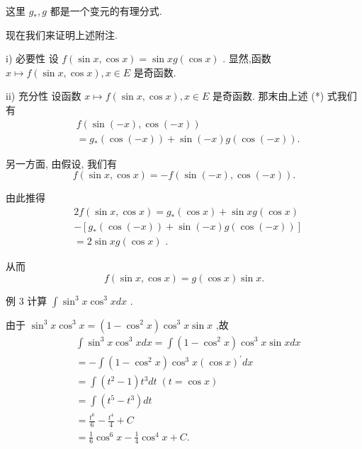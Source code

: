 这里 ${g}_{ * },g$ 都是一个变元的有理分式.

现在我们来证明上述附注.

i) 必要性 设 $f\left( {\sin x,\cos x}\right)  = \sin {xg}\left( {\cos x}\right)$ . 显然,函数 $x \mapsto  f\left( {\sin x,\cos x}\right) ,x \in  E$ 是奇函数.

ii) 充分性 设函数 $x \mapsto  f\left( {\sin x,\cos x}\right) ,x \in  E$ 是奇函数. 那末由上述 (*) 式我们有
\begin{align*}
	&f\left( {\sin \left( {-x}\right) ,\cos \left( {-x}\right) }\right)\\
	&= {g}_{ * }\left( {\cos \left( {-x}\right) }\right)  + \sin \left( {-x}\right) g\left( {\cos \left( {-x}\right) }\right) .
\end{align*}

另一方面, 由假设, 我们有
$$f\left( {\sin x,\cos x}\right)  =  - f\left( {\sin \left( {-x}\right) ,\cos \left( {-x}\right) }\right) .$$

由此推得
\begin{align*}
	&{2f}\left( {\sin x,\cos x}\right)  = {g}_{ * }\left( {\cos x}\right)  + \sin {xg}\left( {\cos x}\right)\\
	&- \left\lbrack  {{g}_{ * }\left( {\cos \left( {-x}\right) }\right)  + \sin \left( {-x}\right) g\left( {\cos \left( {-x}\right) }\right) }\right\rbrack\\
	&= 2\sin {xg}\left( {\cos x}\right) \text{ . }
\end{align*}

从而
$$f\left( {\sin x,\cos x}\right)  = g\left( {\cos x}\right) \sin x.$$

例 3 计算 $\int {\sin }^{3}x{\cos }^{3}{xdx}$ .

由于 ${\sin }^{3}x{\cos }^{3}x = \left( {1 - {\cos }^{2}x}\right) {\cos }^{3}x\sin x$ ,故
\begin{align*}
	&\int {\sin }^{3}x{\cos }^{3}{xdx} = \int \left( {1 - {\cos }^{2}x}\right) {\cos }^{3}x\sin {xdx}\\
	&=  - \int \left( {1 - {\cos }^{2}x}\right) {\cos }^{3}x{\left( \cos x\right) }^{\prime }{dx}\\
	&= \int \left( {{t}^{2} - 1}\right) {t}^{3}{dt}\;\left( {t = \cos x}\right)\\
	&= \int \left( {{t}^{5} - {t}^{3}}\right) {dt}\\
	&= \frac{{t}^{6}}{6} - \frac{{t}^{4}}{4} + C\\
	&= \frac{1}{6}{\cos }^{6}x - \frac{1}{4}{\cos }^{4}x + C.
\end{align*}


